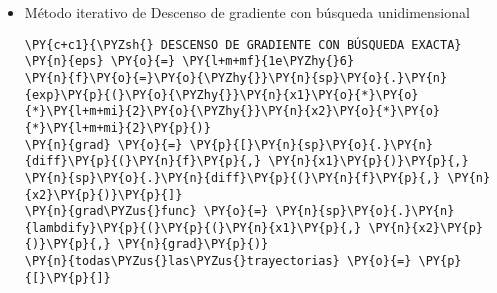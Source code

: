 \begin{itemize}
\item Método iterativo de Descenso de gradiente con búsqueda unidimensional
  \begin{tcolorbox}[breakable, size=fbox, boxrule=1pt, pad at break*=1mm,colback=cellbackground, colframe=cellborder]
\begin{Verbatim}[commandchars=\\\{\}]
\PY{c+c1}{\PYZsh{} DESCENSO DE GRADIENTE CON BÚSQUEDA EXACTA}
\PY{n}{eps} \PY{o}{=} \PY{l+m+mf}{1e\PYZhy{}6}
\PY{n}{f}\PY{o}{=}\PY{o}{\PYZhy{}}\PY{n}{sp}\PY{o}{.}\PY{n}{exp}\PY{p}{(}\PY{o}{\PYZhy{}}\PY{n}{x1}\PY{o}{*}\PY{o}{*}\PY{l+m+mi}{2}\PY{o}{\PYZhy{}}\PY{n}{x2}\PY{o}{*}\PY{o}{*}\PY{l+m+mi}{2}\PY{p}{)}
\PY{n}{grad} \PY{o}{=} \PY{p}{[}\PY{n}{sp}\PY{o}{.}\PY{n}{diff}\PY{p}{(}\PY{n}{f}\PY{p}{,} \PY{n}{x1}\PY{p}{)}\PY{p}{,} \PY{n}{sp}\PY{o}{.}\PY{n}{diff}\PY{p}{(}\PY{n}{f}\PY{p}{,} \PY{n}{x2}\PY{p}{)}\PY{p}{]}
\PY{n}{grad\PYZus{}func} \PY{o}{=} \PY{n}{sp}\PY{o}{.}\PY{n}{lambdify}\PY{p}{(}\PY{p}{(}\PY{n}{x1}\PY{p}{,} \PY{n}{x2}\PY{p}{)}\PY{p}{,} \PY{n}{grad}\PY{p}{)}
\PY{n}{todas\PYZus{}las\PYZus{}trayectorias} \PY{o}{=} \PY{p}{[}\PY{p}{]}


\end{Verbatim}
\end{tcolorbox}
\end{itemize}
